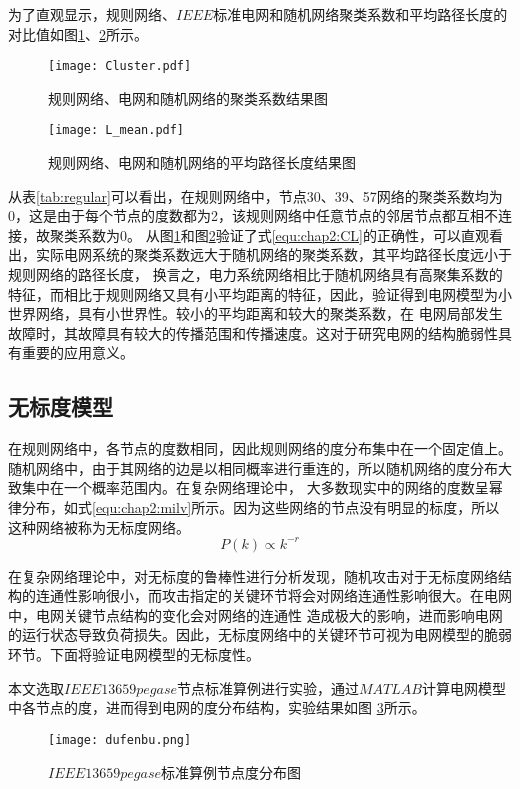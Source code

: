 为了直观显示，规则网络、$IEEE$标准电网和随机网络聚类系数和平均路径长度的对比值如图\ref{fig:Cluster}、\ref{fig:L_mean}所示。
\begin{figure}[H] %
    \centering
    \texttt{[image: Cluster.pdf]}
    \caption{规则网络、电网和随机网络的聚类系数结果图}
    \label{fig:Cluster}
\end{figure}

\begin{figure}[H] %
    \centering
    \texttt{[image: L\_mean.pdf]}
    \caption{规则网络、电网和随机网络的平均路径长度结果图}
    \label{fig:L_mean}
\end{figure}

从表\ref{tab:regular}可以看出，在规则网络中，节点30、39、57网络的聚类系数均为0，这是由于每个节点的度数都为2，该规则网络中任意节点的邻居节点都互相不连接，故聚类系数为0。
从图\ref{fig:Cluster}和图\ref{fig:L_mean}验证了式\ref{equ:chap2:CL}的正确性，可以直观看出，实际电网系统的聚类系数远大于随机网络的聚类系数，其平均路径长度远小于规则网络的路径长度，
换言之，电力系统网络相比于随机网络具有高聚集系数的特征，而相比于规则网络又具有小平均距离的特征，因此，验证得到电网模型为小世界网络，具有小世界性。较小的平均距离和较大的聚类系数，在
电网局部发生故障时，其故障具有较大的传播范围和传播速度。这对于研究电网的结构脆弱性具有重要的应用意义。

\subsection{无标度模型}
\label{sec:windModel}
在规则网络中，各节点的度数相同，因此规则网络的度分布集中在一个固定值上。随机网络中，由于其网络的边是以相同概率进行重连的，所以随机网络的度分布大致集中在一个概率范围内。在复杂网络理论中，
大多数现实中的网络的度数呈幂律分布，如式\ref{equ:chap2:milv}所示。因为这些网络的节点没有明显的标度，所以这种网络被称为无标度网络。
\begin{equation}
\label{equ:chap2:milv}
P(k) \propto k^{-r}
\end{equation}

在复杂网络理论中，对无标度的鲁棒性进行分析发现，随机攻击对于无标度网络结构的连通性影响很小，而攻击指定的关键环节将会对网络连通性影响很大。在电网中，电网关键节点结构的变化会对网络的连通性
造成极大的影响，进而影响电网的运行状态导致负荷损失\cite{refsBA}。因此，无标度网络中的关键环节可视为电网模型的脆弱环节。下面将验证电网模型的无标度性。

本文选取$IEEE13659pegase$节点标准算例进行实验，通过$MATLAB$计算电网模型中各节点的度，进而得到电网的度分布结构，实验结果如图
\ref{fig:dufenbu}所示。
\begin{figure}[H] %
  \centering
  \texttt{[image: dufenbu.png]}
  \caption{$IEEE13659pegase$标准算例节点度分布图}
  \label{fig:dufenbu}
\end{figure}

